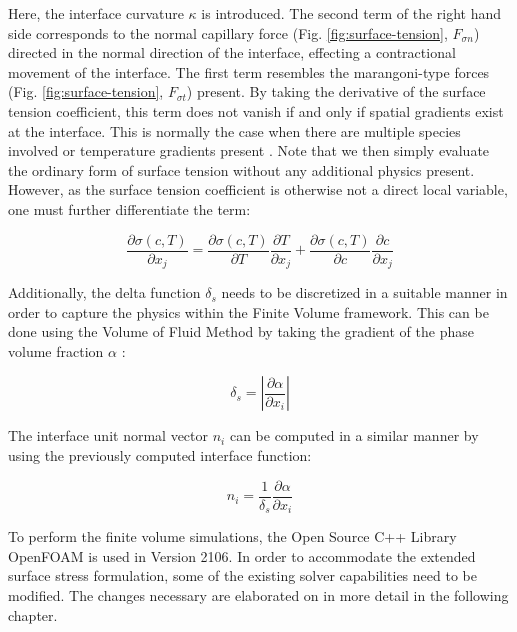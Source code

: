 \documentclass[conference,final,a4paper]{IEEEtran}
\begin{document}
Here, the interface curvature $\kappa$ is introduced. The second term of the right hand side corresponds to the normal capillary force (Fig. \ref{fig:surface-tension}, $F_{\sigma n}$) directed in the normal direction of the interface, effecting a contractional movement of the interface. The first term resembles the marangoni-type forces (Fig. \ref{fig:surface-tension}, $F_{\sigma t}$) present. By taking the derivative of the surface tension coefficient, this term does not vanish if and only if spatial gradients exist at the interface. This is normally the case when there are multiple species involved or temperature gradients present \cite{j.straubThermokapillareGrenzflachenkonvektionGasblasen1990}. Note that we then simply evaluate the ordinary form of surface tension without any additional physics present. However, as the surface tension coefficient is otherwise not a direct local variable, one must further differentiate the term:

\begin{equation}
    \frac{\partial \sigma(c,T)}{\partial x_j} = \frac{\partial \sigma(c,T)}{\partial T} \frac{\partial T}{\partial x_j} + \frac{\partial \sigma(c,T)}{\partial c} \frac{\partial c}{\partial x_j}
    \label{eq:sigmadiff}
\end{equation}

Additionally, the delta function $\delta_s$ needs to be discretized in a suitable manner in order to capture the physics within the Finite Volume framework. This can be done using the Volume of Fluid Method by taking the gradient of the phase volume fraction $\alpha$ \cite{gueyffierVolumeofFluidInterfaceTracking1999,hirtVolumeFluidVOF1981}:

\begin{equation}
    \delta_s = \left\lvert \frac{\partial \alpha}{\partial x_i} \right\rvert
\end{equation}

The interface unit normal vector $n_i$ can be computed in a similar manner by using the previously computed interface function:

\begin{equation}
    n_i = \frac{1}{\delta_s} \frac{\partial \alpha}{\partial x_i}
\end{equation}

To perform the finite volume simulations, the Open Source C++ Library OpenFOAM is used in Version 2106. In order to accommodate the extended surface stress formulation, some of the existing solver capabilities need to be modified. The changes necessary are elaborated on in more detail in the following chapter.
\end{document}
